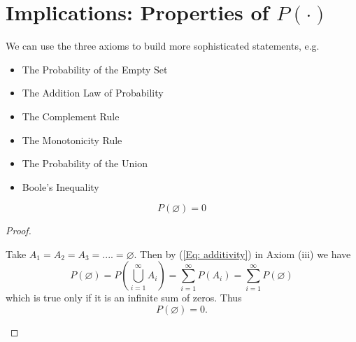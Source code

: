 \documentclass[notes=show, handout]{beamer}\usepackage[]{graphicx}\usepackage[]{color}
\begin{document}
\section{Implications: Properties of $P(\cdot)$}

\begin{frame}{\secname}
  We can use the three axioms to build more sophisticated statements, e.g.
  \bigskip
  \begin{itemize}
  \item The Probability of the Empty Set
  \item The Addition Law of Probability
  \item The Complement Rule
  \item The Monotonicity Rule
  \item The Probability of the Union
  \item Boole's Inequality
  \end{itemize}
\end{frame}

\begin{frame}{\secname}
  \begin{theorem}
  $$P(\varnothing)=0$$
  \end{theorem}
  \pause
  \begin{proof}
  \begin{footnotesize}
  Take $A_1=A_2=A_3=....=\varnothing$. Then by (\ref{Eq: additivity}) in Axiom (iii) we have
  $$
  P(\varnothing)= P\left(  \bigcup_{i=1}^{\infty} A_i \right)
  = \sum_{i=1}^{\infty} P(A_i)
  =\sum_{i=1}^{\infty} P(\varnothing)
  $$
  which is true only if it is an infinite sum of zeros. Thus
  $$
  P(\varnothing) =  0.
  $$
  \end{footnotesize}
  \end{proof}
\end{frame}
\end{document}
